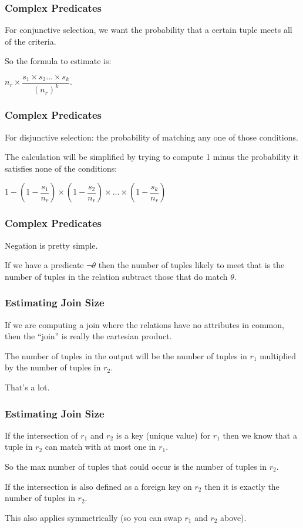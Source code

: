 \begin{frame}
\frametitle{Complex Predicates}

For conjunctive selection, we want the probability that a certain tuple meets all of the criteria. 

So the formula to estimate is:

$n_{r} \times \dfrac{s_{1} \times s_{2}... \times s_{k}}{(n_{r})^{k}}$.


\end{frame}

\begin{frame}
\frametitle{Complex Predicates}

For disjunctive selection: the probability of matching any one of those conditions. 

The calculation will be simplified by trying to compute 1 minus the probability it satisfies none of the conditions: 

$1 - (1 - \dfrac{s_{1}}{n_{r}}) \times (1 - \dfrac{s_{2}}{n_{r}}) \times ... \times (1 - \dfrac{s_{k}}{n_{r}})$

\end{frame}


\begin{frame}
\frametitle{Complex Predicates}

Negation is pretty simple.

If we have a predicate $\neg\theta$ then the number of tuples likely to meet that is the number of tuples in the relation subtract those that do match $\theta$.


\end{frame}

\begin{frame}
\frametitle{Estimating Join Size}

If we are computing a join where the relations have no attributes in common, then the ``join'' is really the cartesian product.

The number of tuples in the output will be the number of tuples in $r_{1}$ multiplied by the number of tuples in $r_{2}$. 

That's a lot.

\end{frame}

\begin{frame}
\frametitle{Estimating Join Size}

If the intersection of $r_{1}$ and $r_{2}$ is a key (unique value) for $r_{1}$ then we know that a tuple in $r_{2}$ can match with at most one in $r_{1}$.

So the max number of tuples that could occur is the number of tuples in $r_{2}$. 

If the intersection is also defined as a foreign key on $r_{2}$ then it is exactly the number of tuples in $r_{2}$. 

This also applies symmetrically (so you can swap $r_{1}$ and $r_{2}$ above).


\end{frame}

